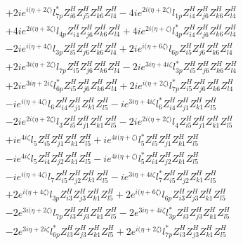 \begin{align}
 &+2 i e^{i \Big(\eta +2 \zeta \Big)} l_{7p}^* Z_{{i 6}}^{H} Z_{{j 5}}^{H} Z_{{k 6}}^{H} Z_{{l 4}}^{H} -4 i e^{2 i \Big(\eta +2 \zeta \Big)} l_{1p} Z_{{i 4}}^{H} Z_{{j 6}}^{H} Z_{{k 6}}^{H} Z_{{l 4}}^{H} \nonumber \\ 
 &+4 i e^{2 i \Big(\eta +3 \zeta \Big)} l_{4p} Z_{{i 4}}^{H} Z_{{j 6}}^{H} Z_{{k 6}}^{H} Z_{{l 4}}^{H} +4 i e^{2 i \Big(\eta +\zeta \Big)} l_{4p}^* Z_{{i 4}}^{H} Z_{{j 6}}^{H} Z_{{k 6}}^{H} Z_{{l 4}}^{H} \nonumber \\ 
 &-2 i e^{i \Big(\eta +4 \zeta \Big)} l_{3p} Z_{{i 5}}^{H} Z_{{j 6}}^{H} Z_{{k 6}}^{H} Z_{{l 4}}^{H} +2 i e^{i \Big(\eta +6 \zeta \Big)} l_{6p} Z_{{i 5}}^{H} Z_{{j 6}}^{H} Z_{{k 6}}^{H} Z_{{l 4}}^{H} \nonumber \\ 
 &+2 i e^{3 i \Big(\eta +2 \zeta \Big)} l_{7p} Z_{{i 5}}^{H} Z_{{j 6}}^{H} Z_{{k 6}}^{H} Z_{{l 4}}^{H} -2 i e^{3 i \eta +4 i \zeta } l_{3p}^* Z_{{i 5}}^{H} Z_{{j 6}}^{H} Z_{{k 6}}^{H} Z_{{l 4}}^{H} \nonumber \\ 
 &+2 i e^{3 i \eta +2 i \zeta } l_{6p}^* Z_{{i 5}}^{H} Z_{{j 6}}^{H} Z_{{k 6}}^{H} Z_{{l 4}}^{H} +2 i e^{i \Big(\eta +2 \zeta \Big)} l_{7p}^* Z_{{i 5}}^{H} Z_{{j 6}}^{H} Z_{{k 6}}^{H} Z_{{l 4}}^{H} \nonumber \\ 
 &-i e^{i \Big(\eta +4 \zeta \Big)} l_6 Z_{{i 4}}^{H} Z_{{j 1}}^{H} Z_{{k 1}}^{H} Z_{{l 5}}^{H} -i e^{3 i \eta +4 i \zeta } l_6^* Z_{{i 4}}^{H} Z_{{j 1}}^{H} Z_{{k 1}}^{H} Z_{{l 5}}^{H} \nonumber \\ 
 &-2 i e^{2 i \Big(\eta +2 \zeta \Big)} l_3 Z_{{i 5}}^{H} Z_{{j 1}}^{H} Z_{{k 1}}^{H} Z_{{l 5}}^{H} -2 i e^{2 i \Big(\eta +2 \zeta \Big)} l_4 Z_{{i 5}}^{H} Z_{{j 1}}^{H} Z_{{k 1}}^{H} Z_{{l 5}}^{H} \nonumber \\ 
 &+i e^{4 i \zeta } l_5 Z_{{i 5}}^{H} Z_{{j 1}}^{H} Z_{{k 1}}^{H} Z_{{l 5}}^{H} +i e^{4 i \Big(\eta +\zeta \Big)} l_5^* Z_{{i 5}}^{H} Z_{{j 1}}^{H} Z_{{k 1}}^{H} Z_{{l 5}}^{H} \nonumber \\ 
 &-i e^{4 i \zeta } l_5 Z_{{i 4}}^{H} Z_{{j 2}}^{H} Z_{{k 1}}^{H} Z_{{l 5}}^{H} -i e^{4 i \Big(\eta +\zeta \Big)} l_5^* Z_{{i 4}}^{H} Z_{{j 2}}^{H} Z_{{k 1}}^{H} Z_{{l 5}}^{H} \nonumber \\ 
 &-i e^{i \Big(\eta +4 \zeta \Big)} l_7 Z_{{i 5}}^{H} Z_{{j 2}}^{H} Z_{{k 1}}^{H} Z_{{l 5}}^{H} -i e^{3 i \eta +4 i \zeta } l_7^* Z_{{i 5}}^{H} Z_{{j 2}}^{H} Z_{{k 1}}^{H} Z_{{l 5}}^{H} \nonumber \\ 
 &+2 e^{i \Big(\eta +4 \zeta \Big)} l_{3p} Z_{{i 3}}^{H} Z_{{j 3}}^{H} Z_{{k 1}}^{H} Z_{{l 5}}^{H} +2 e^{i \Big(\eta +6 \zeta \Big)} l_{6p} Z_{{i 3}}^{H} Z_{{j 3}}^{H} Z_{{k 1}}^{H} Z_{{l 5}}^{H} \nonumber \\ 
 &-2 e^{3 i \Big(\eta +2 \zeta \Big)} l_{7p} Z_{{i 3}}^{H} Z_{{j 3}}^{H} Z_{{k 1}}^{H} Z_{{l 5}}^{H} -2 e^{3 i \eta +4 i \zeta } l_{3p}^* Z_{{i 3}}^{H} Z_{{j 3}}^{H} Z_{{k 1}}^{H} Z_{{l 5}}^{H} \nonumber \\ 
 &-2 e^{3 i \eta +2 i \zeta } l_{6p}^* Z_{{i 3}}^{H} Z_{{j 3}}^{H} Z_{{k 1}}^{H} Z_{{l 5}}^{H} +2 e^{i \Big(\eta +2 \zeta \Big)} l_{7p}^* Z_{{i 3}}^{H} Z_{{j 3}}^{H} Z_{{k 1}}^{H} Z_{{l 5}}^{H} \nonumber 
\end{align} 
